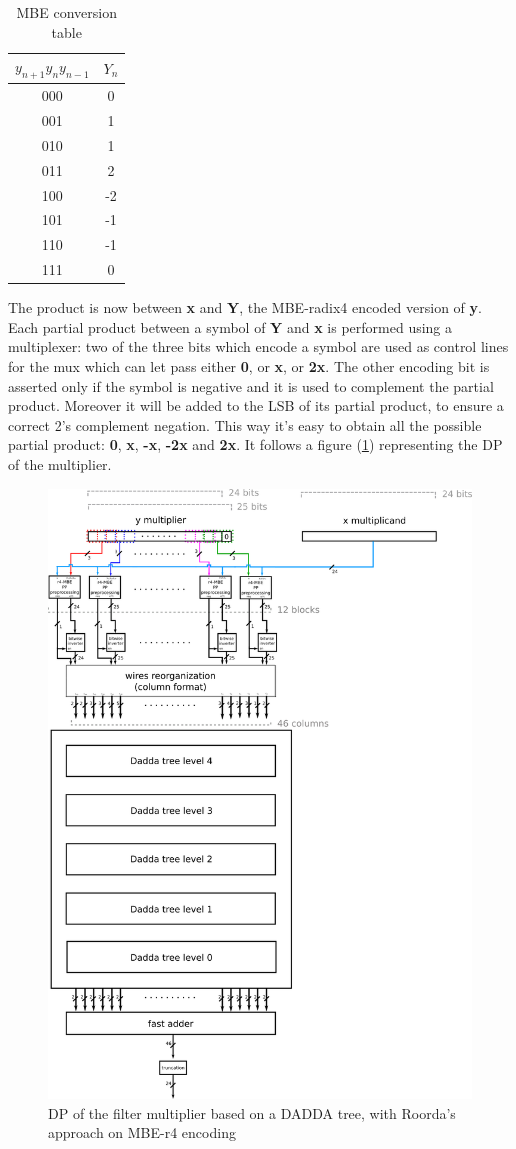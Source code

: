 \documentclass[a4paper]{article}
\begin{document}
	\begin{table}[hbtp]
		\centering
		\begin{tabular}{|c|c|}
			\hline
			$y_{n+1} y_n y_{n-1}$ & $Y_{n}$  \\ \hline
			000 & 0  \\ \hline
			001 & 1  \\ \hline
			010 & 1  \\ \hline
			011 & 2  \\ \hline
			100 & -2 \\ \hline
			101 & -1 \\ \hline
			110 & -1 \\ \hline
			111 & 0  \\ \hline
		\end{tabular}
		\caption{MBE conversion table}
		\label{tab:mbe-tab}
	\end{table}

	The product is now between \textbf{x} and \textbf{Y}, the MBE-radix4 encoded version of \textbf{y}.
	Each partial product between a symbol of \textbf{Y} and \textbf{x} is performed using a multiplexer: two of
	the three bits which encode a symbol are used as control lines for the mux which can let pass either \textbf{0},
	or \textbf{x}, or \textbf{2x}. The other encoding bit is asserted only if the symbol is negative and it is used
	to complement the partial product. Moreover it will be added to the LSB of its partial product, to ensure a
	correct 2's complement negation. This way it's easy to obtain all the possible partial product: \textbf{0},
	\textbf{x}, \textbf{-x}, \textbf{-2x} and \textbf{2x}.
	It follows a figure (\ref{fig:v1-dp}) representing the DP of the multiplier.

	\begin{figure}[hbtp]
	\centering
	\includegraphics[width=.6\linewidth]{media/v1_abstract_DP.png}
	\caption{DP of the filter multiplier based on a DADDA tree, with Roorda's approach on MBE-r4 encoding}
	\label{fig:v1-dp}
	\end{figure}
\end{document}
